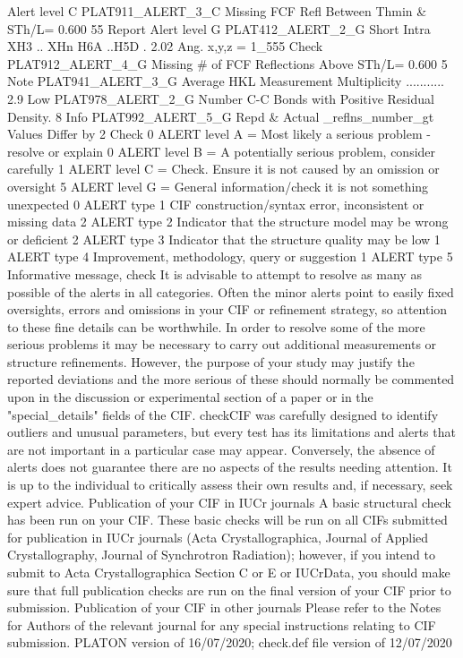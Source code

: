  Alert level C
PLAT911_ALERT_3_C Missing FCF Refl Between Thmin & STh/L=    0.600         55 Report
 Alert level G
PLAT412_ALERT_2_G Short Intra XH3 .. XHn     H6A      ..H5D      .       2.02 Ang.  
                                                      x,y,z  =      1_555 Check 
PLAT912_ALERT_4_G Missing # of FCF Reflections Above STh/L=  0.600          5 Note  
PLAT941_ALERT_3_G Average HKL Measurement Multiplicity ...........        2.9 Low   
PLAT978_ALERT_2_G Number C-C Bonds with Positive Residual Density.          8 Info  
PLAT992_ALERT_5_G Repd & Actual _reflns_number_gt Values Differ by          2 Check 
   0 ALERT level A = Most likely a serious problem - resolve or explain
   0 ALERT level B = A potentially serious problem, consider carefully
   1 ALERT level C = Check. Ensure it is not caused by an omission or oversight
   5 ALERT level G = General information/check it is not something unexpected
   0 ALERT type 1 CIF construction/syntax error, inconsistent or missing data
   2 ALERT type 2 Indicator that the structure model may be wrong or deficient
   2 ALERT type 3 Indicator that the structure quality may be low
   1 ALERT type 4 Improvement, methodology, query or suggestion
   1 ALERT type 5 Informative message, check
It is advisable to attempt to resolve as many as possible of the alerts in all categories. Often the
minor alerts point to easily fixed oversights, errors and omissions in your CIF or refinement
strategy, so attention to these fine details can be worthwhile. In order to resolve some of the more
serious problems it may be necessary to carry out additional measurements or structure
refinements. However, the purpose of your study may justify the reported deviations and the more
serious of these should normally be commented upon in the discussion or experimental section of a
paper or in the "special_details" fields of the CIF. checkCIF was carefully designed to identify
outliers and unusual parameters, but every test has its limitations and alerts that are not important
in a particular case may appear. Conversely, the absence of alerts does not guarantee there are no
aspects of the results needing attention. It is up to the individual to critically assess their own
results and, if necessary, seek expert advice.
Publication of your CIF in IUCr journals 
A basic structural check has been run on your CIF. These basic checks will be run on all CIFs
submitted for publication in IUCr journals (Acta Crystallographica, Journal of Applied 
Crystallography, Journal of Synchrotron Radiation); however, if you intend to submit to Acta
Crystallographica Section C or E or IUCrData, you should make sure that full publication checks
are run on the final version of your CIF prior to submission.
Publication of your CIF in other journals 
Please refer to the Notes for Authors of the relevant journal for any special instructions relating to
CIF submission.
PLATON version of 16/07/2020; check.def file version of 12/07/2020 


